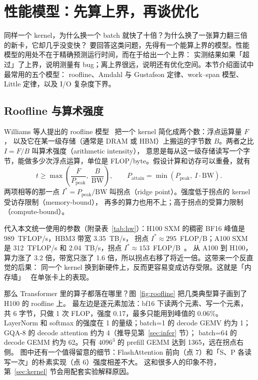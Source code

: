 \section{性能模型：先算上界，再谈优化}
\label{sec:perf}

同样一个 kernel，为什么换一个 batch 就快了十倍？为什么换了一张算力翻三倍的新卡，它却几乎没变快？
要回答这类问题，先得有一个能算上界的模型。性能模型的用处不在于精确预测运行时间，而在于给出一个上界：
实测结果如果「超过」了上界，说明测量有 bug；离上界很远，说明还有优化空间。本节介绍面试中最常用的五个模型：
roofline、Amdahl 与 Gustafson 定律、work--span 模型、Little 定律，以及 I/O 复杂度下界。

\subsection{Roofline 与算术强度}

Williams 等人提出的 roofline 模型~\cite{williams2009roofline} 把一个 kernel 简化成两个数：浮点运算量 $F$，
以及它在某一级存储（通常是 DRAM 或 HBM）上搬运的字节数 $B$。两者之比 $I=F/B$ 叫算术强度（arithmetic intensity），
意思是每从这一级存储读写一个字节，能做多少次浮点运算，单位是 FLOP/byte。假设计算和访存可以重叠，就有
\begin{equation}
t \ge \max\!\left(\frac{F}{P_{\text{peak}}},\ \frac{B}{\mathrm{BW}}\right),\qquad
P_{\text{attain}} = \min(P_{\text{peak}},\ I\cdot \mathrm{BW}).
\label{eq:roofline}
\end{equation}
两项相等的那一点 $I^\ast = P_{\text{peak}}/\mathrm{BW}$ 叫拐点（ridge point）。强度低于拐点的 kernel 受访存限制（memory-bound），
再多的算力也用不上；高于拐点的受算力限制（compute-bound）。

代入本文统一使用的参数（附录表~\ref{tab:hw}）：H100 SXM 的稠密 BF16 峰值是 989~TFLOP/s，HBM3 带宽 3.35~TB/s，
拐点 $I^\ast\approx 295$~FLOP/B；A100 SXM 是 312~TFLOP/s 和 2.04~TB/s，拐点 $I^\ast\approx 153$~FLOP/B~\cite{nvidiaa100,nvidiah100}。
从 A100 到 H100，算力涨了 3.2 倍，带宽只涨了 1.6 倍，所以拐点右移了将近一倍。这带来一个反直觉的后果：
同一个 kernel 换到新硬件上，反而更容易变成访存受限。这就是「内存墙」~\cite{gholami2024memorywall} 在单张卡上的表现。

那么 Transformer 里的算子都落在哪里？图~\ref{fig:roofline} 把几类典型算子画到了 H100 的 roofline 上。
最左边是逐元素加法：bf16 下读两个元素、写一个元素，共 6 字节，只做 1 次 FLOP，强度 0.17，最多只能用到峰值的 0.06\%。
LayerNorm 和 softmax 的强度在 1 的量级；batch=1 的 decode GEMV 约为 1；GQA-8 的 decode attention 约为 4（推导见第~\ref{sec:infer} 节）；
batch=64 的 decode GEMM 约为 62。只有 $4096^3$ 的 prefill GEMM 达到 1365，远在拐点右侧。
图中还有一个值得留意的细节：FlashAttention 前向（点 7）和「S、P 各读写一次」的朴素实现（点 6）强度相差不大。
这和很多人的印象不符，第~\ref{sec:kernel} 节会用配套实验解释原因。

